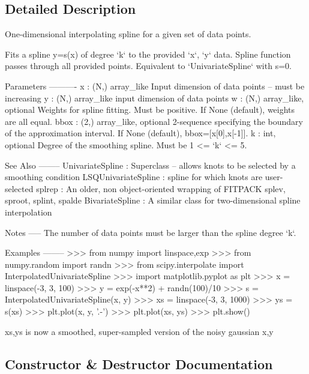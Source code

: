 \subsection{Detailed Description}
\begin{DoxyVerb}One-dimensional interpolating spline for a given set of data points.

Fits a spline y=s(x) of degree `k` to the provided `x`, `y` data. Spline
function passes through all provided points. Equivalent to
`UnivariateSpline` with  s=0.

Parameters
----------
x : (N,) array_like
    Input dimension of data points -- must be increasing
y : (N,) array_like
    input dimension of data points
w : (N,) array_like, optional
    Weights for spline fitting.  Must be positive.  If None (default),
    weights are all equal.
bbox : (2,) array_like, optional
    2-sequence specifying the boundary of the approximation interval. If
    None (default), bbox=[x[0],x[-1]].
k : int, optional
    Degree of the smoothing spline.  Must be 1 <= `k` <= 5.

See Also
--------
UnivariateSpline : Superclass -- allows knots to be selected by a
    smoothing condition
LSQUnivariateSpline : spline for which knots are user-selected
splrep : An older, non object-oriented wrapping of FITPACK
splev, sproot, splint, spalde
BivariateSpline : A similar class for two-dimensional spline interpolation

Notes
-----
The number of data points must be larger than the spline degree `k`.

Examples
--------
>>> from numpy import linspace,exp
>>> from numpy.random import randn
>>> from scipy.interpolate import InterpolatedUnivariateSpline
>>> import matplotlib.pyplot as plt
>>> x = linspace(-3, 3, 100)
>>> y = exp(-x**2) + randn(100)/10
>>> s = InterpolatedUnivariateSpline(x, y)
>>> xs = linspace(-3, 3, 1000)
>>> ys = s(xs)
>>> plt.plot(x, y, '.-')
>>> plt.plot(xs, ys)
>>> plt.show()

xs,ys is now a smoothed, super-sampled version of the noisy gaussian x,y\end{DoxyVerb}
 

\subsection{Constructor \& Destructor Documentation}
\hypertarget{classscipy_1_1interpolate_1_1fitpack2_1_1InterpolatedUnivariateSpline_ac9db10bc78deb78578a9fba3459a5aec}{}
